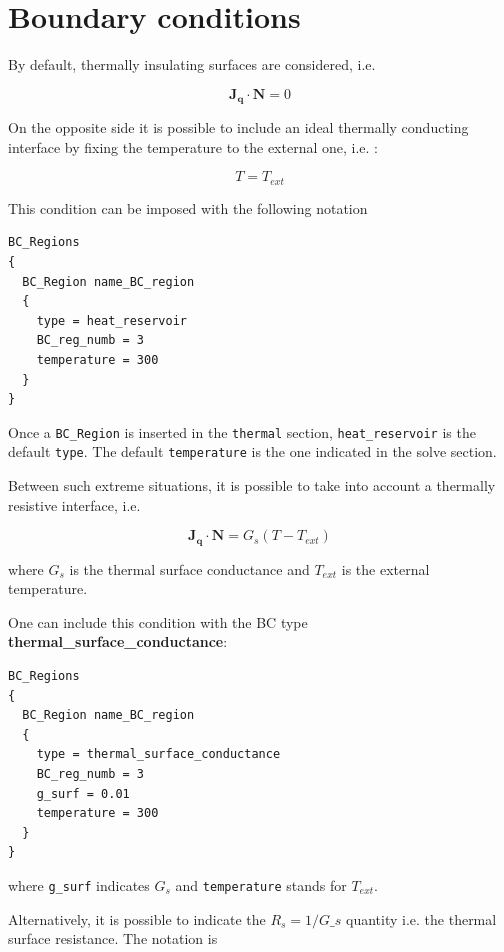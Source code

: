 \section{Boundary conditions}

By default, thermally insulating surfaces are considered, i.e. 

\begin{equation}\label{TH}
\mathbf{J_q}\cdot \mathbf{N} = 0
\end{equation}

On the opposite side it is possible to include an ideal thermally conducting interface by fixing the temperature to the external one, i.e. : 

\begin{equation}\label{T}
T = T_{ext}
\end{equation}

This condition can be imposed with the following notation

\begin{verbatim}
BC_Regions
{
  BC_Region name_BC_region
  {
    type = heat_reservoir
    BC_reg_numb = 3
    temperature = 300
  }
}
\end{verbatim}

Once a \texttt{BC\_Region}  is inserted in the \texttt{thermal} section, \texttt{heat\_reservoir} is the default \texttt{type}. The default \texttt{temperature} is the one indicated in the solve section.   

Between  such extreme situations, it is possible to take into account a thermally resistive interface, i.e.

\begin{equation}\label{TH}
\mathbf{J_q}\cdot \mathbf{N} = G_s (T - T_{ext})
\end{equation}

where $G_s$ is the thermal surface conductance and $T_{ext}$ is the external temperature.

One can include this condition with the BC type \textbf{thermal\_surface\_conductance}:

\begin{verbatim}
BC_Regions
{
  BC_Region name_BC_region
  {
    type = thermal_surface_conductance
    BC_reg_numb = 3
    g_surf = 0.01
    temperature = 300
  }
}
\end{verbatim}

where \texttt{g\_surf} indicates $G_s$ and \texttt{temperature} stands for $T_{ext}$.

Alternatively, it is possible to indicate the $R_s = 1/G\_s$ quantity i.e. the thermal surface resistance. The notation is


